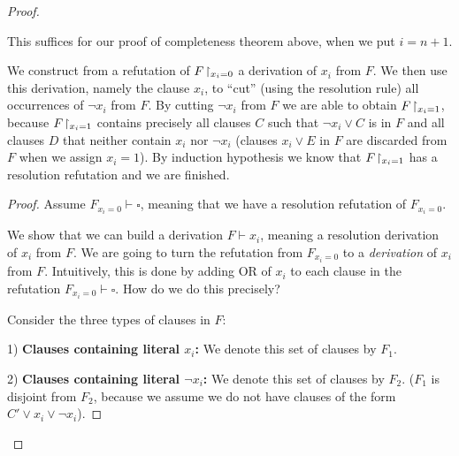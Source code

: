 \begin{proof}
\begin{lemma}
\end{lemma}
This suffices for our proof of completeness theorem above, when we put $i = n+1$.

\begin{tcolorbox}[colframe=white, colback=blue!5, boxrule=0mm, sharp corners]

We construct from a refutation of $F\!\upharpoonright_{x_i=0}$ a derivation of $x_i$ from $F$. We then use this derivation, namely the clause $x_i$, to ``cut'' (using the resolution rule) all occurrences of $\neg x_i$ from $F$. By cutting $\neg x_i$ from $F$ we are able to obtain  $F\!\upharpoonright_{x_i=1}$, because $F\!\upharpoonright_{x_i=1}$ contains precisely all clauses $C$ such that $\neg x_i\lor C$ is in $F$ and all clauses $D$ that neither contain $x_i$ nor $\neg x_i$ (clauses $x_i\lor E$ in $F$ are discarded from $F$ when we assign $x_i=1$). By induction hypothesis we know that  $F\!\upharpoonright_{x_i=1}$ has a resolution refutation and we are finished.
\end{tcolorbox}





\begin{proof}
Assume $F_{x_i = 0} \vdash \square$, meaning that we have a resolution refutation of $F_{x_i = 0}$.

We show that we can build a derivation $F \vdash x_i$, meaning a resolution derivation of $x_i$ from $F$.
We are going to turn the refutation from $F_{x_i = 0}$ to a \emph{derivation} of $x_i$ from $F$.
  Intuitively, this is done by adding OR of $x_i$ to each clause in the refutation $F_{x_i = 0} \vdash \square$.
How do we do this precisely?  
  

Consider the three types of clauses in $F$:

  1) \textbf{Clauses containing literal $x_i$:}  
     We denote this set of clauses by $F_1$.

  2) \textbf{Clauses containing literal $\neg x_i$:}  
     We denote this set of clauses by $F_2$.  
     ($F_1$ is disjoint from $F_2$, because we assume we do not  have clauses of the form $C' \lor x_i \lor \neg x_i$).


\end{proof}
\end{proof}
